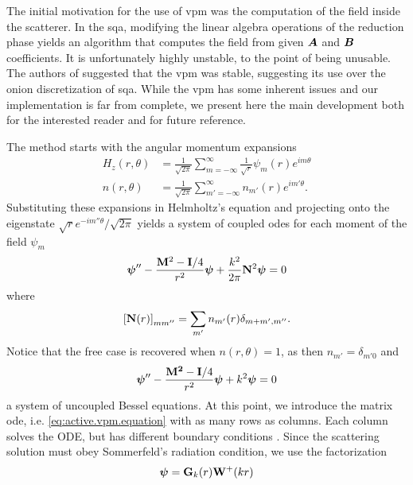 The initial motivation for the use of \gls{vpm} was the computation 
of the field inside the scatterer. In the \gls{sqa}, modifying 
the linear algebra operations of the reduction phase yields
an algorithm that computes the field from given $\boldsymbol{A}$ and $\boldsymbol{B}$
coefficients. It is unfortunately highly unstable, to the point 
of being unusable. The authors of \cite{FOR2012} suggested that
the \gls{vpm} was stable, suggesting its use over the onion
discretization of \gls{sqa}. While the \gls{vpm} has some inherent
issues and our implementation is far from complete, we present
here the main development both for the interested reader and for 
future reference. 

The method starts with the angular momentum expansions
  \begin{subequations}
  \begin{align}
   H_z(r,\theta)	&= \frac{1}{\sqrt{2\pi}}\sum_{m=-\infty}^\infty \frac{1}{\sqrt{r}}\psi_m(r)e^{im\theta}	\\
   n(r,\theta)		&= \frac{1}{\sqrt{2\pi}}\sum_{m'=-\infty}^\infty n_{m'}(r)e^{im'\theta}.
  \end{align}
  \end{subequations}
Substituting these expansions in Helmholtz's equation and projecting
onto the eigenstate $\sqrt{r}e^{-im''\theta}/\sqrt{2\pi}$ yields a
system of coupled \glspl{ode} for each moment of the field $\psi_m$
	\begin{equation}
		\label{eq:active.vpm.equation}
		\boldsymbol{\psi}''-\frac{\mathbf{M}^2-\mathbf{I}/4}{r^2}\boldsymbol{\psi}+\frac{k^2}{2\pi}\mathbf{N}^2\boldsymbol{\psi}=0
	\end{equation}
where 
	\begin{equation*}
		\left[\mathbf{N}(r)\right]_{mm''}=\sum_{m'}n_{m'}(r)\delta_{m+m',m''}.
	\end{equation*}
Notice that the free case is recovered when $n(r,\theta)=1$, as 
then $n_{m'}=\delta_{m'0}$ and 
	\begin{equation}
		\boldsymbol{\psi}''-\frac{\mathbf{M^2}-\mathbf{I}/4}{r^2}\boldsymbol{\psi}+k^2\boldsymbol{\psi}=0
	\end{equation}
a system of uncoupled Bessel equations. At this point, we 
introduce the matrix \gls{ode}, i.e. \eqref{eq:active.vpm.equation} with as many 
rows as columns. Each column solves the ODE, but has different boundary conditions
\cite[\S15.2]{NEW1982}. Since the scattering solution must obey Sommerfeld's radiation
condition, we use the factorization
	\begin{equation}
		\boldsymbol{\psi} = \mathbf{G}_k(r)\mathbf{W}^{+}(kr)
	\end{equation}
